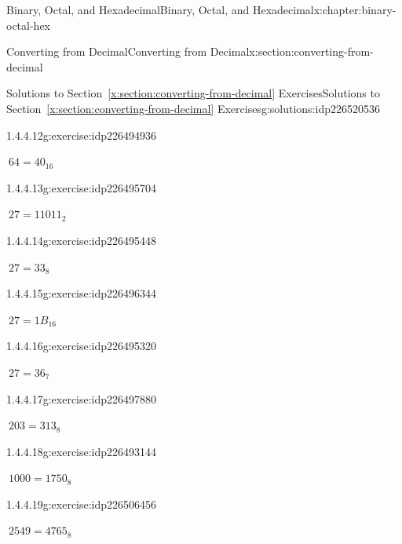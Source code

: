 \documentclass[twoside,10pt,]{book}
\newcommand{\xreffont}{\relax}
\numberwithin{equation}{section}
\begin{document}
\begin{chapterptx}{Binary, Octal, and Hexadecimal}{}{Binary, Octal, and Hexadecimal}{}{}{x:chapter:binary-octal-hex}
\begin{sectionptx}{Converting from Decimal}{}{Converting from Decimal}{}{}{x:section:converting-from-decimal}
\begin{solutions-subsection}{Solutions to Section~{\xreffont\ref*{x:section:converting-from-decimal}} Exercises}{}{Solutions to Section~{\xreffont\ref*{x:section:converting-from-decimal}} Exercises}{}{}{g:solutions:idp226520536}
\begin{exercisegroup}
\begin{divisionsolutioneg}{1.4.4.12}{}{g:exercise:idp226494936}%
\par\smallskip%
\noindent\hypertarget{g:solution:idp226493400-main}{}\(\ 64=40_{16}\)\end{divisionsolutioneg}%
\end{exercisegroup}
\par\medskip\noindent
\begin{exercisegroup}
\begin{divisionsolutioneg}{1.4.4.13}{}{g:exercise:idp226495704}%
\par\smallskip%
\noindent\hypertarget{g:solution:idp226493784-main}{}\(\ 27=11011_2\)\end{divisionsolutioneg}%
\begin{divisionsolutioneg}{1.4.4.14}{}{g:exercise:idp226495448}%
\par\smallskip%
\noindent\hypertarget{g:solution:idp226496600-main}{}\(\ 27=33_8\)\end{divisionsolutioneg}%
\begin{divisionsolutioneg}{1.4.4.15}{}{g:exercise:idp226496344}%
\par\smallskip%
\noindent\hypertarget{g:solution:idp226492888-main}{}\(\ 27=1B_{16}\)\end{divisionsolutioneg}%
\begin{divisionsolutioneg}{1.4.4.16}{}{g:exercise:idp226495320}%
\par\smallskip%
\noindent\hypertarget{g:solution:idp226496728-main}{}\(\ 27=36_7\)\end{divisionsolutioneg}%
\end{exercisegroup}
\par\medskip\noindent
\begin{exercisegroup}
\begin{divisionsolutioneg}{1.4.4.17}{}{g:exercise:idp226497880}%
\par\smallskip%
\noindent\hypertarget{g:solution:idp226498648-main}{}\(\ 203=313_8\)\end{divisionsolutioneg}%
\begin{divisionsolutioneg}{1.4.4.18}{}{g:exercise:idp226493144}%
\par\smallskip%
\noindent\hypertarget{g:solution:idp226491480-main}{}\(\ 1000=1750_8\)\end{divisionsolutioneg}%
\begin{divisionsolutioneg}{1.4.4.19}{}{g:exercise:idp226506456}%
\par\smallskip%
\noindent\hypertarget{g:solution:idp226499544-main}{}\(\ 2549=4765_8\)\end{divisionsolutioneg}%

\end{exercisegroup}
\end{solutions-subsection}
\end{sectionptx}
\end{chapterptx}
\end{document}
